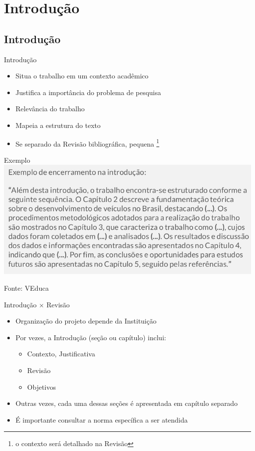 \documentclass{beamer}
\begin{document}
\section{Introdução}
\subsection{Introdução}

\begin{frame}{Introdução}
  \begin{itemize}
  \item Situa o trabalho em um contexto acadêmico
  \item Justifica a importância do problema de pesquisa
  \item Relevância do trabalho
  \item Mapeia a estrutura do texto
  \item Se separado da Revisão bibliográfica, pequena \footnote{o
      contexto será detalhado na Revisão}
  \end{itemize}
\end{frame}

\begin{frame}{Exemplo}
  \includegraphics[width=\textwidth]{ProjetoI/exemplo-introducao}

  Fonte: VEduca
\end{frame}

\begin{frame}{Introdução $\times$ Revisão}
  \begin{itemize}
  \item Organização do projeto depende da Instituição
  \item Por vezes, a Introdução (seção ou capítulo) inclui:
    \begin{itemize}
    \item<2-> Contexto, Justificativa
    \item<2-> Revisão
    \item<2-> Objetivos
    \end{itemize}
  \item Outras vezes, cada uma dessas seções é apresentada em capítulo
    separado
  \item É importante \alert{consultar} a norma \alert{específica} a
    ser atendida
  \end{itemize}
\end{frame}
\end{document}
